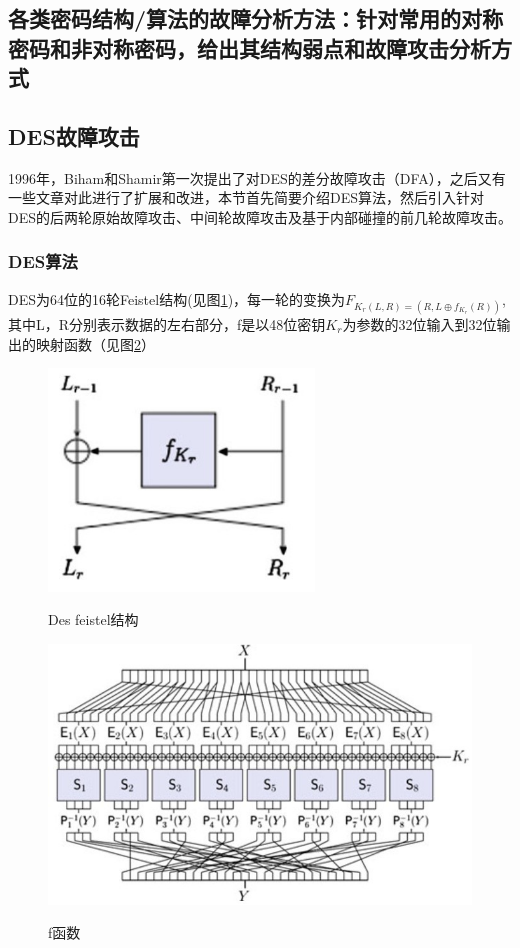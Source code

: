 \documentclass[a4paper,12pt]{article}
\begin{document}
\begin{CJK}{UTF8}{gkai}
\subsection{各类密码结构/算法的故障分析方法：针对常用的对称密码和非对称密码，给出其结构弱点和故障攻击分析方式}
\subsection{DES故障攻击}
1996年，Biham和Shamir第一次提出了对DES的差分故障攻击（DFA），之后又有一些文章对此进行了扩展和改进，本节首先简要介绍DES算法，然后引入针对DES的后两轮原始故障攻击、中间轮故障攻击及基于内部碰撞的前几轮故障攻击。
\subsubsection{DES算法}
DES为64位的16轮Feistel结构(见图\ref{des_feistel})，每一轮的变换为$F_{K_r(L,R)=(R,L \oplus f_{K_r}(R))}$,其中L，R分别表示数据的左右部分，f是以48位密钥$K_r$为参数的32位输入到32位输出的映射函数（见图\ref{des_f_function}）
\begin{figure}
\centering
\caption{Des feistel结构}
\includegraphics[width=200pt]{Feistel.jpg}
\label{des_feistel}
\end{figure}

\begin{figure}
\centering
\caption{f函数}
\includegraphics[width=400pt]{des_f_function.jpg}
\label{des_f_function}
\end{figure}



\end{CJK}
\end{document}
